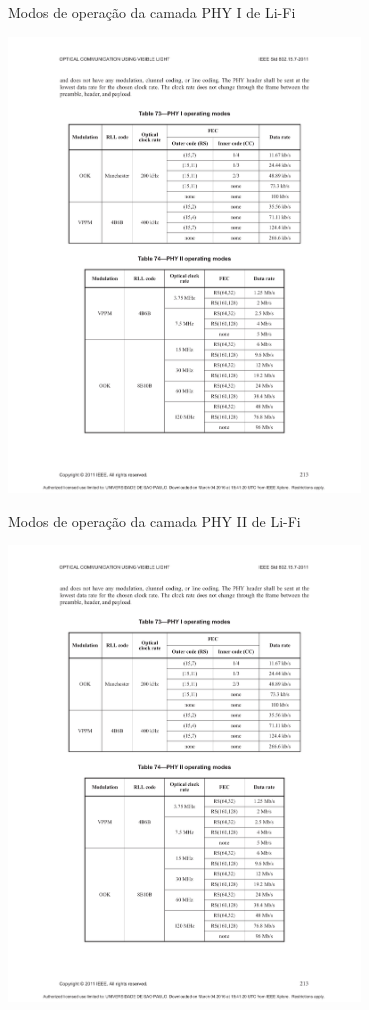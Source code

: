 	\begin{table}[htbp]
		\caption{\label{tab_phy1} Modos de operação da camada PHY I de Li-Fi}

		\centering
		\includegraphics[clip, trim=37mm 151mm 36mm 51mm,  width=0.7\textwidth]{pag213.pdf}
	\end{table}
	
	\begin{table}[htbp]
		\caption{\label{tab_phy2} Modos de operação da camada PHY II de Li-Fi}
		\centering
			\includegraphics[clip, trim=46.55mm 36.79mm 46.74mm 142.30mm,  width=0.7\textwidth]{pag213.pdf}
	\end{table}

